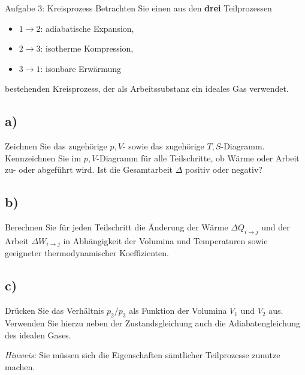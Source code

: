 \begin{aufgabe}{Aufgabe 3: Kreisprozess}
    Betrachten Sie einen aus den \textbf{drei} Teilprozessen
    \begin{itemize}
        \item $1 \to 2$: adiabatische Expansion,
        \item $2 \to 3$: isotherme Kompression,
        \item $3 \to 1$: isonbare Erwärmung
    \end{itemize}
    bestehenden Kreisprozess, der als Arbeitssubstanz ein ideales Gas verwendet.

    \subsection{a)}
    Zeichnen Sie das zugehörige $p,V$- sowie das zugehörige $T,S$-Diagramm.
    Kennzeichnen Sie im $p,V$-Diagramm für alle Teilschritte, ob Wärme oder Arbeit zu- oder abgeführt wird.
    Ist die Gesamtarbeit $\Delta$ positiv oder negativ?

    \subsection{b)}
    Berechnen Sie für jeden Teilschritt die Änderung der Wärme $\Delta Q_{i \to j}$ und der Arbeit $\Delta W_{i \to j}$ in Abhängigkeit der Volumina und Temperaturen sowie geeigneter thermodynamischer Koeffizienten.

    \subsection{c)}
    Drücken Sie das Verhältnis $p_2 / p_3$ als Funktion der Volumina $V_1$ und $V_2$ aus.
    Verwenden Sie hierzu neben der Zustandsgleichung auch die Adiabatengleichung des idealen Gases.

    \textit{Hinweis:} Sie müssen sich die Eigenschaften sämtlicher Teilprozesse zunutze machen.
\end{aufgabe}

